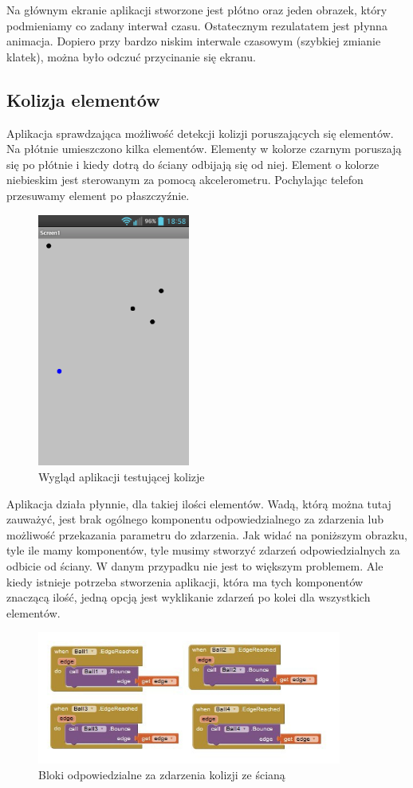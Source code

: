 Na głównym ekranie aplikacji stworzone jest płótno oraz jeden obrazek, który podmieniamy co zadany interwał czasu. Ostatecznym rezulatatem jest płynna animacja. Dopiero przy bardzo niskim interwale czasowym (szybkiej zmianie klatek), można było odczuć przycinanie się ekranu.


\subsection{Kolizja elementów}

Aplikacja sprawdzająca możliwość detekcji kolizji poruszających się elementów. Na płótnie umieszczono kilka elementów. Elementy w kolorze czarnym poruszają się po płótnie i kiedy dotrą do ściany odbijają się od niej. Element o kolorze niebieskim jest sterowanym za pomocą akcelerometru. Pochylając telefon przesuwamy element po płaszczyźnie.

\begin{figure}[H]
\centering\includegraphics[width=5cm]{figures/apps/ai_collision}
\caption{Wygląd aplikacji testującej kolizje}
\end{figure}

Aplikacja działa płynnie, dla takiej ilości elementów. Wadą, którą można tutaj zauważyć, jest brak ogólnego komponentu odpowiedzialnego za zdarzenia lub możliwość przekazania parametru do zdarzenia. Jak widać na poniższym obrazku, tyle ile mamy komponentów, tyle musimy stworzyć zdarzeń odpowiedzialnych za odbicie od ściany. W danym przypadku nie jest to większym problemem. Ale kiedy istnieje potrzeba stworzenia aplikacji, która ma tych komponentów znaczącą ilość, jedną opcją jest wyklikanie zdarzeń po kolei dla wszystkich elementów.


\begin{figure}[H]
\centering\includegraphics[width=10cm]{figures/apps/ai_collision_blocks}
\caption{Bloki odpowiedzialne za zdarzenia kolizji ze ścianą}
\end{figure}

